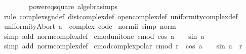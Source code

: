 \begin{isabellebody}
\ \ \ \ \ \ \ \ power{}{\isacharunderscore}{\kern0pt}eq{\isacharunderscore}{\kern0pt}square\ algebra{\isacharunderscore}{\kern0pt}simps{\isacharparenright}{\kern0pt}\isanewline
{}\isamarkupfalse%
\ {\isacharparenleft}{\kern0pt}rule\ complex{\isacharunderscore}{\kern0pt}sgn{\isacharunderscore}{\kern0pt}def\ dist{\isacharunderscore}{\kern0pt}complex{\isacharunderscore}{\kern0pt}def\ open{\isacharunderscore}{\kern0pt}complex{\isacharunderscore}{\kern0pt}def\ uniformity{\isacharunderscore}{\kern0pt}complex{\isacharunderscore}{\kern0pt}def{\isacharparenright}{\kern0pt}{\isacharplus}{\kern0pt}%
\endisatagproof
{\isafoldproof}%
%
\isadelimproof
\isanewline
%
\endisadelimproof
\isanewline
{}\isamarkupfalse%
\isanewline
\isanewline
{}\isamarkupfalse%
\ uniformity{\isacharunderscore}{\kern0pt}Abort{\isacharbrackleft}{\kern0pt}\ {\isacharprime}{\kern0pt}a\ {\isacharequal}{\kern0pt}\ complex{\isacharcomma}{\kern0pt}\ code{\isacharbrackright}{\kern0pt}\isanewline
\isanewline
{}\isamarkupfalse%
\ norm{\isacharunderscore}{\kern0pt}ii\ {\isacharbrackleft}{\kern0pt}simp{\isacharbrackright}{\kern0pt}{\isacharcolon}{\kern0pt}\ {\isachardoublequoteopen}norm\ {\isasymi}\ {\isacharequal}{\kern0pt}\ {}{\isachardoublequoteclose}\isanewline
%
\isadelimproof
\ \ %
\endisadelimproof
%
\isatagproof
{}\isamarkupfalse%
\ {\isacharparenleft}{\kern0pt}simp\ add{\isacharcolon}{\kern0pt}\ norm{\isacharunderscore}{\kern0pt}complex{\isacharunderscore}{\kern0pt}def{\isacharparenright}{\kern0pt}%
\endisatagproof
{\isafoldproof}%
%
\isadelimproof
\isanewline
%
\endisadelimproof
\isanewline
{}\isamarkupfalse%
\ cmod{\isacharunderscore}{\kern0pt}unit{\isacharunderscore}{\kern0pt}one{\isacharcolon}{\kern0pt}\ {\isachardoublequoteopen}cmod\ {\isacharparenleft}{\kern0pt}cos\ a\ {\isacharplus}{\kern0pt}\ {\isasymi}\ {\isacharasterisk}{\kern0pt}\ sin\ a{\isacharparenright}{\kern0pt}\ {\isacharequal}{\kern0pt}\ {}{\isachardoublequoteclose}\isanewline
%
\isadelimproof
\ \ %
\endisadelimproof
%
\isatagproof
{}\isamarkupfalse%
\ {\isacharparenleft}{\kern0pt}simp\ add{\isacharcolon}{\kern0pt}\ norm{\isacharunderscore}{\kern0pt}complex{\isacharunderscore}{\kern0pt}def{\isacharparenright}{\kern0pt}%
\endisatagproof
{\isafoldproof}%
%
\isadelimproof
\isanewline
%
\endisadelimproof
\isanewline
{}\isamarkupfalse%
\ cmod{\isacharunderscore}{\kern0pt}complex{\isacharunderscore}{\kern0pt}polar{\isacharcolon}{\kern0pt}\ {\isachardoublequoteopen}cmod\ {\isacharparenleft}{\kern0pt}r\ {\isacharasterisk}{\kern0pt}\ {\isacharparenleft}{\kern0pt}cos\ a\ {\isacharplus}{\kern0pt}\ {\isasymi}\ {\isacharasterisk}{\kern0pt}\ sin\ a{\isacharparenright}{\kern0pt}{\isacharparenright}{\kern0pt}\ {\isacharequal}{\kern0pt}\ {\isasymbar}r{\isasymbar}{\isachardoublequoteclose}\isanewline

\end{isabellebody}

